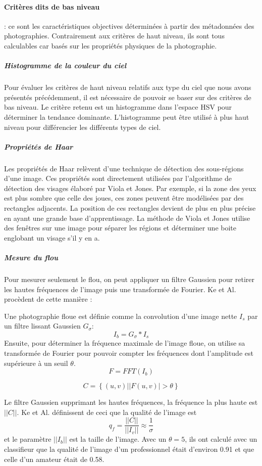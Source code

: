 \documentclass[11pt, french,screen]{report-rd-info}
\begin{document}
\paragraph{Critères dits de bas niveau} : ce sont les caractéristiques objectives déterminées à partir des métadonnées des photographies. Contrairement aux critères de haut niveau, ils sont tous calculables car basés sur les propriétés physiques de la photographie.
\subparagraph{Histogramme de la couleur du ciel}
Pour évaluer les critères de haut niveau relatifs aux type du ciel que nous avons présentés précédemment, il est nécessaire de pouvoir se baser sur des critères de bas niveau. Le critère retenu est un histogramme dans l’espace HSV pour déterminer la tendance dominante. L’histogramme peut être utilisé à plus haut niveau pour différencier les différents types de ciel.
\subparagraph{Propriétés de Haar}
Les propriétés de Haar relèvent d’une technique de détection des sous-régions d’une image. Ces propriétés sont directement utilisées par l’algorithme de détection des visages élaboré par Viola et Jones. Par exemple, si la zone des yeux est plus sombre que celle des joues, ces zones peuvent être modélisées par des rectangles adjacents. La position de ces rectangles devient de plus en plus précise en ayant une grande base d’apprentissage. La méthode de Viola et Jones utilise des fenêtres sur une image pour séparer les régions et déterminer une boite englobant un visage s’il y en a.
\subparagraph{Mesure du flou}
Pour mesurer seulement le flou, on peut appliquer un filtre Gaussien pour retirer les hautes fréquences de l’image puis une transformée de Fourier. Ke et Al.\cite{Ke} procèdent de cette manière : 

Une photographie floue est définie comme la convolution d'une image nette $I_s$ par un filtre lissant Gaussien $G_\sigma$:
\begin{equation}
I_b = G_\sigma * I_s 
\end{equation}
Ensuite, pour déterminer la fréquence maximale de l'image floue, on utilise sa transformée de Fourier pour pouvoir compter les fréquences dont l'amplitude est supérieure à un seuil $\theta$.
\begin{equation}
F = FFT(I_b)
\end{equation}

\begin{equation}
C = \left\{(u,v) | |F(u,v)| > \theta\right\}
\end{equation}
 
Le filtre Gaussien supprimant les hautes fréquences, la fréquence la plus haute est $||C||$. Ke et Al. définissent de ceci que la qualité de l'image est 
\begin{equation}
q_f = \frac{||C||}{||I_v||} \approx \frac{1}{\sigma}
\end{equation}
et le paramètre $||I_b||$ est la taille de l'image. Avec un $\theta = 5$, ils ont calculé avec un classifieur que la qualité de l'image d'un professionnel était d'environ 0.91 et que celle d'un amateur était de 0.58.
\end{document}
